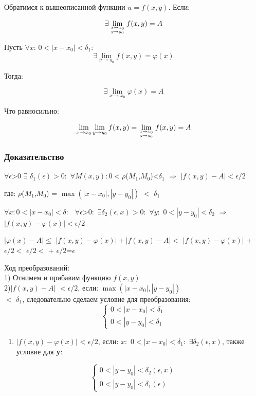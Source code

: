 Обратимся к вышеописанной функции \(u=f(x, y)\). Если:

\[\exists\lim _{x \rightarrow x_{0} \atop y \rightarrow y_{0} } f(x, y)=A\]

Пусть \(\forall\)\(x\): \(0<\left|x-x_{0}\right|<\delta_{1}\):
\[\exists\lim _{y \rightarrow y_{0}} f(x, y)=\varphi(x)\]

Тогда:

\[\exists\lim _{x \rightarrow x_{0}} \varphi(x)=A\]

Что равносильно:

\[\lim _{x \rightarrow x_{0}} \lim _{y \rightarrow y_{0}} f(x, y)=\lim _{x \rightarrow x_{0} \atop y \rightarrow y_{0}} f(x, y)=A\]

\subsubsection{Доказательство}

\(\forall \epsilon\)\textgreater{}0 \(\exists\)
\(\delta_{1}(\epsilon) > 0:\)
\(\forall M(x,y):\)\(0<\rho\)(\(M_{1}\),\(M_{0}\))\textless{}\(\delta_{1}\)
\(\Rightarrow\) \(\left|f(x,y)-A\right|<\epsilon/ 2\)

где: \(\rho\)(\(M_{1}\),\(M_{0}\)) = \(\max(|x-x_{0}|,| y-y_{0}|)\)
\(<\) \(\delta_{1}\)

\(\forall x:0<|x-x_{0}|<\delta:\)
\(\ \ \forall \epsilon\)\textgreater{}0\(:\)
\(\exists \delta_{2}(\epsilon,x)>0:\) \(\forall y:\)
\(0<\left|y-y_{0}\right|<\delta_{2}\) \(\Rightarrow\)
\(\left|f(x,y)-\varphi(x)\right|<\epsilon/ 2\)

\(\left|\varphi(x)-A\right|\leq\)
\(|f(x, y)-\varphi(x)|+| f(x, y)-A|\)\(<\) \(|f(x, y)-\varphi(x)|\) +
\(\epsilon/2<\) \(\epsilon/ 2<\) + \(\epsilon/ 2\)=\(\epsilon\)

Ход преобразований: \\
1) Отнимем и прибавим функцию \(f(x,y)\) \\
2)\(| f(x, y)-A|\) \(< \epsilon /2\), если: \(\max(|x-x_{0}|,| y-y_{0}|)\) \\
\(<\) \(\delta_{1}\), следовательно сделаем условие для преобразования: \\

\[\left\{\begin{array}{l}
0<\left|x-x_{0}\right|<\delta_{1} \\
0<\left|y-y_{0}\right|<\delta_{1}
\end{array}\right.\]

\begin{enumerate}
\def\labelenumi{\arabic{enumi})}
\setcounter{enumi}{2}
\tightlist
\item
  \(|f(x, y)-\varphi(x)|\) \textless{} \(\epsilon /2\), если: \(x:\)
  \(0<\left|x-x_{0}\right|<\delta_{1}:\)
  \(\exists \delta_{2}(\epsilon, x)\), также условие для \textbf{y}:
\end{enumerate}

\[\left\{\begin{array}{l}
0<\left|y-y_{0}\right|<\delta_{2}(\epsilon, x) \\
0<\left|y-y_{0}\right|<\delta_{1}(\epsilon)
\end{array}\right.\]
